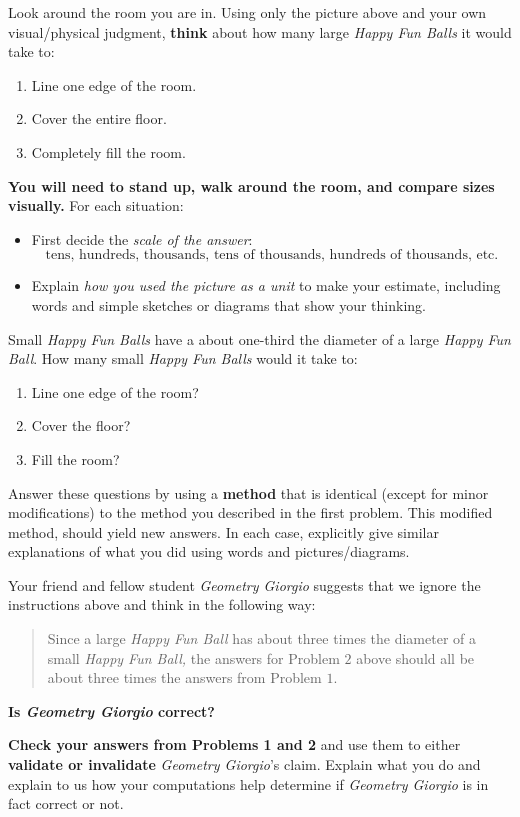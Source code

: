 \documentclass[handout,noauthor,nooutcomes,hints,12pt]{ximera}
\begin{document}
\begin{question}
Look around the room you are in. 
Using only the picture above and your own visual/physical judgment,
\textbf{think} about how many large \textit{Happy Fun Balls} it would take to:
\begin{enumerate}
  \item Line one edge of the room.
  \item Cover the entire floor.
  \item Completely fill the room.
\end{enumerate}
\textbf{You will need to stand up, walk around the room, and compare sizes visually.}
For each situation:
\begin{itemize}
  \item First decide the \emph{scale of the answer}:
  \[
  \text{tens, hundreds, thousands, tens of thousands, hundreds of thousands, etc.}
  \]
  \item Explain \emph{how you used the picture as a unit} to make your estimate, including
   words and simple sketches or diagrams that show your thinking.
\end{itemize}
\end{question}
\mynewpage

\begin{question}
  Small \textit{Happy Fun Balls} have a about one-third the diameter of a large
  \textit{Happy Fun Ball}. How many small \textit{Happy Fun Balls} would it take
  to:
  \begin{enumerate}
    \item Line one edge of the room?
    \item Cover the floor?
    \item Fill the room?
  \end{enumerate}
  Answer these questions by using a \textbf{method} that is identical (except for minor modifications) to the method you described in the first problem. This modified method, should yield new answers.
  In each case, explicitly give similar explanations of what you did using words and pictures/diagrams. 
\end{question}
\mynewpage

\begin{question}
  Your friend and fellow student \textit{Geometry Giorgio} suggests
  that we ignore the instructions above and think in the following way:
  \begin{quote}
    Since a large \textit{Happy Fun Ball} has about three times the
    diameter of a small \textit{Happy Fun Ball,} the answers for Problem
    $2$ above should all be about three times the answers from Problem
    $1$.
  \end{quote}
\begin{center}
  \bf Is \textit{Geometry Giorgio} correct?
\end{center}
\textbf{Check your answers from Problems 1 and 2} and use them to either \textbf{validate or invalidate}
\textit{Geometry Giorgio}'s claim. Explain what you do and explain to us how your computations help determine if 
\textit{Geometry Giorgio} is in fact correct or not.
\end{question}
\end{document}
